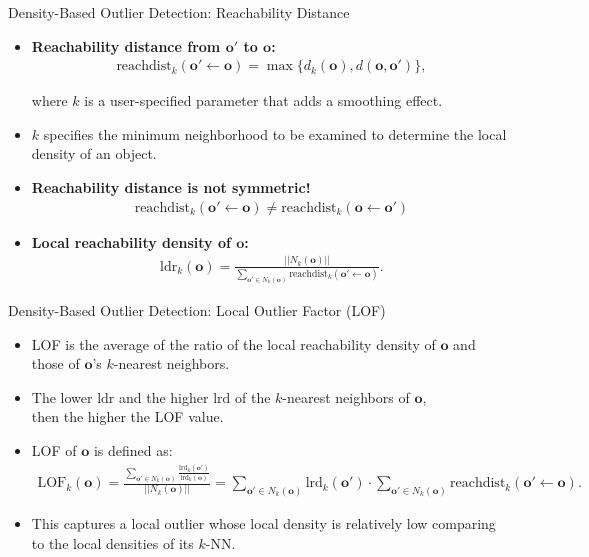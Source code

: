\begin{frame}{Density-Based Outlier Detection: Reachability Distance}
	\begin{itemize}
		\item \textbf{\color{airforceblue}Reachability distance from $\mathbf{o'}$ to $\mathbf{o}$:}
		      \begin{align*}
			      \text{reachdist}_k(\mathbf{o}' \leftarrow \mathbf{o}) = \max \{d_k(\mathbf{o}), d(\mathbf{o},\mathbf{o}')\},
		      \end{align*}

		      where $k$ is a user-specified parameter that adds a smoothing effect.
		\item $k$ specifies the minimum neighborhood to be examined to determine the local density of an object.
		\item \textbf{Reachability distance is not symmetric!}
		      \begin{align*}
			      \text{reachdist}_k(\mathbf{o}' \leftarrow \mathbf{o}) \neq \text{reachdist}_k(\mathbf{o} \leftarrow \mathbf{o}')
		      \end{align*}
		\item \textbf{Local reachability density of $\mathbf{o}$:}
		      \begin{align*}
			      \text{ldr}_k(\mathbf{o}) = \frac{||N_k(\mathbf{o})||}{\sum_{\mathbf{o'} \in N_k(\mathbf{o})} \text{reachdist}_k(\mathbf{o'} \leftarrow \mathbf{o})}.
		      \end{align*}
	\end{itemize}
\end{frame}


\begin{frame}{Density-Based Outlier Detection: Local Outlier Factor (LOF)}
	\begin{itemize}
		\item LOF is the average of the ratio of the local reachability density of $\mathbf{o}$ and \\
		      those of $\mathbf{o}$'s $k$-nearest neighbors.
		\item The lower $\text{ldr}$ and the higher $\text{lrd}$ of the $k$-nearest neighbors of $\mathbf{o}$,\\
		      then the higher the LOF value.
		\item LOF of $\mathbf{o}$ is defined as:
		      \begin{align*}
			      \text{LOF}_k(\mathbf{o}) = \frac{\sum_{\mathbf{o'} \in N_k(\mathbf{o})} \frac{\text{lrd}_k(\mathbf{o'})}{\text{lrd}_k(\mathbf{o})}}{||N_k(\mathbf{o})||} =
			      \sum_{\mathbf{o'} \in N_k(\mathbf{o})} \text{lrd}_k(\mathbf{o'}) \cdot \sum_{\mathbf{o'} \in N_k(\mathbf{o})} \text{reachdist}_k(\mathbf{o'} \leftarrow \mathbf{o}).
		      \end{align*}
		\item This captures a local outlier whose local density is relatively low comparing to the local densities of its $k$-NN.

	\end{itemize}

\end{frame}

